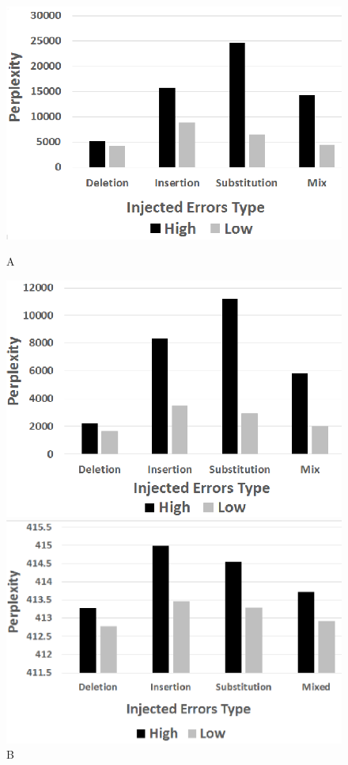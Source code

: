 \begin{figure}[t] \label{figure:Synthetic_Errors_Detection}
\begin{minipage}[t]{1.0\textwidth}
\begin{minipage}[t]{.24\textwidth}
\centering
  \includegraphics[width=\linewidth]{figs/Synth_NG_12.eps}
  \caption{A}
\end{minipage}%
\begin{minipage}[t]{.24\textwidth}
\centering
\includegraphics[width=\linewidth]{figs/Synth_NG_3.eps}
  \caption{B}
\end{minipage}%
\begin{minipage}[t]{.24\textwidth}
\centering
  \includegraphics[width=\linewidth]{figs/Synth_RNN_12.eps}

\end{minipage}
\end{minipage}
\end{figure}
